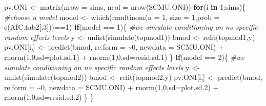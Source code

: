 \documentclass[
]{article}
\newenvironment{Shaded}{\begin{snugshade}}{\end{snugshade}}
\newcommand{\AttributeTok}[1]{\textcolor[rgb]{0.77,0.63,0.00}{#1}}
\newcommand{\CommentTok}[1]{\textcolor[rgb]{0.56,0.35,0.01}{\textit{#1}}}
\newcommand{\ControlFlowTok}[1]{\textcolor[rgb]{0.13,0.29,0.53}{\textbf{#1}}}
\newcommand{\DecValTok}[1]{\textcolor[rgb]{0.00,0.00,0.81}{#1}}
\newcommand{\FloatTok}[1]{\textcolor[rgb]{0.00,0.00,0.81}{#1}}
\newcommand{\FunctionTok}[1]{\textcolor[rgb]{0.00,0.00,0.00}{#1}}
\newcommand{\NormalTok}[1]{#1}
\newcommand{\OtherTok}[1]{\textcolor[rgb]{0.56,0.35,0.01}{#1}}
\newcommand{\SpecialCharTok}[1]{\textcolor[rgb]{0.00,0.00,0.00}{#1}}
\begin{document}
\begin{Shaded}
\begin{Highlighting}[]
\NormalTok{pv.ONI }\OtherTok{\textless{}{-}} \FunctionTok{matrix}\NormalTok{(}\AttributeTok{nrow =}\NormalTok{ sims, }\AttributeTok{ncol =} \FunctionTok{nrow}\NormalTok{(SCMU.ONI))}
\ControlFlowTok{for}\NormalTok{(i }\ControlFlowTok{in} \DecValTok{1}\SpecialCharTok{:}\NormalTok{sims)\{}
  \CommentTok{\#choose a model }
\NormalTok{  model }\OtherTok{\textless{}{-}} \FunctionTok{which}\NormalTok{(}\FunctionTok{rmultinom}\NormalTok{(}\AttributeTok{n =} \DecValTok{1}\NormalTok{, }\AttributeTok{size =} \DecValTok{1}\NormalTok{,}\AttributeTok{prob =} \FunctionTok{c}\NormalTok{(AIC.tab2[,}\DecValTok{3}\NormalTok{]))}\SpecialCharTok{==}\DecValTok{1}\NormalTok{)}
  \ControlFlowTok{if}\NormalTok{(model }\SpecialCharTok{==} \DecValTok{1}\NormalTok{)\{}
    \CommentTok{\#we simulate conditioning on no specific random effects levels}
\NormalTok{    y }\OtherTok{\textless{}{-}} \FunctionTok{unlist}\NormalTok{(}\FunctionTok{simulate}\NormalTok{(topmod1))}
\NormalTok{    bmod }\OtherTok{\textless{}{-}} \FunctionTok{refit}\NormalTok{(topmod1,y)}
\NormalTok{    pv.ONI[i,] }\OtherTok{\textless{}{-}} \FunctionTok{predict}\NormalTok{(bmod, }\AttributeTok{re.form =} \SpecialCharTok{\textasciitilde{}}\DecValTok{0}\NormalTok{, }\AttributeTok{newdata =}\NormalTok{ SCMU.ONI) }\SpecialCharTok{+} \FunctionTok{rnorm}\NormalTok{(}\DecValTok{1}\NormalTok{,}\DecValTok{0}\NormalTok{,}\AttributeTok{sd=}\NormalTok{plot.sd}\FloatTok{.1}\NormalTok{) }\SpecialCharTok{+} \FunctionTok{rnorm}\NormalTok{(}\DecValTok{1}\NormalTok{,}\DecValTok{0}\NormalTok{,}\AttributeTok{sd=}\NormalTok{resid.sd}\FloatTok{.1}\NormalTok{)}
\NormalTok{  \}}
  \ControlFlowTok{if}\NormalTok{(model }\SpecialCharTok{==} \DecValTok{2}\NormalTok{)\{}
    \CommentTok{\#we simulate conditioning on no specific random effects levels}
\NormalTok{    y }\OtherTok{\textless{}{-}} \FunctionTok{unlist}\NormalTok{(}\FunctionTok{simulate}\NormalTok{(topmod2))}
\NormalTok{    bmod }\OtherTok{\textless{}{-}} \FunctionTok{refit}\NormalTok{(topmod2,y)}
\NormalTok{    pv.ONI[i,] }\OtherTok{\textless{}{-}} \FunctionTok{predict}\NormalTok{(bmod, }\AttributeTok{re.form =} \SpecialCharTok{\textasciitilde{}}\DecValTok{0}\NormalTok{, }\AttributeTok{newdata =}\NormalTok{ SCMU.ONI) }\SpecialCharTok{+} \FunctionTok{rnorm}\NormalTok{(}\DecValTok{1}\NormalTok{,}\DecValTok{0}\NormalTok{,}\AttributeTok{sd=}\NormalTok{plot.sd}\FloatTok{.2}\NormalTok{) }\SpecialCharTok{+} \FunctionTok{rnorm}\NormalTok{(}\DecValTok{1}\NormalTok{,}\DecValTok{0}\NormalTok{,}\AttributeTok{sd=}\NormalTok{resid.sd}\FloatTok{.2}\NormalTok{)}
\NormalTok{  \}}
\NormalTok{\}  }
\end{Highlighting}
\end{Shaded}
\end{document}
